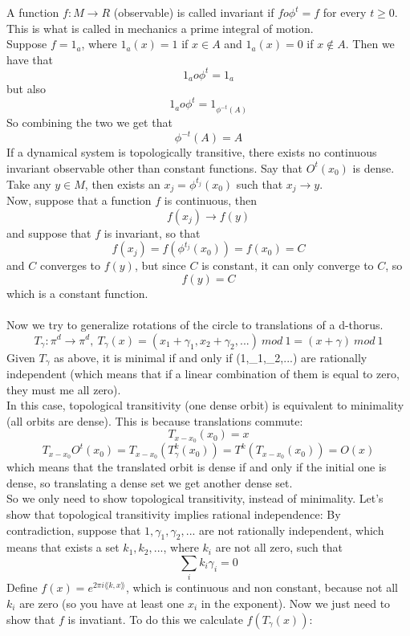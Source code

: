 A function $f:M\rightarrow R$ (observable) is called invariant if $fo\phi^t = f$ for every $t \geq 0$. This is what is called in mechanics a prime integral of motion. \\
Suppose $f = 1_a$, where $1_a(x) = 1$ if $x\in A$ and $1_a(x) = 0$ if $x \notin A$. Then we have that
$$
	1_a o \phi^t = 1_a
$$
but also 
$$
	1_a o \phi^t = 1_{\phi^{-t}(A)}
$$
So combining the two we get that 
$$
	\phi^{-t}(A) = A
$$
If a dynamical system is topologically transitive, there exists no continuous invariant observable other than constant functions.
Say that $O^t(x_0)$ is dense. Take any $y \in M$, then exists an $x_j = \phi^{t_j}(x_0)$ such that $x_j \longrightarrow y$. \\
Now, suppose that a function $f$ is continuous, then
$$
	f(x_j) \longrightarrow f(y)
$$
and suppose that $f$ is invariant, so that
$$
	f(x_j) = f(\phi^{t_j}(x_0)) = f(x_0) = C
$$
and $C$ converges to $f(y)$, but since $C$ is constant, it can only converge to $C$, so 
$$
	f(y) = C
$$
which is a constant function. \\ \\
Now we try to generalize rotations of the circle to translations of a d-thorus. \\
$$
	T_\gamma : \pi^d \rightarrow \pi^d, \ T_\gamma (x) = (x_1 + \gamma_1, x_2 + \gamma_2, ...) \ mod \ 1 = (x + \gamma) \ mod \ 1
$$
Given $T_\gamma$ as above, it is minimal if and only if (1,\gamma_1,\gamma_2,...) are rationally independent (which means that if a linear combination of them is equal to zero, they must me all zero). \\
In this case, topological transitivity (one dense orbit) is equivalent to minimality (all orbits are dense). This is because translations commute:
$$
	T_{x-x_0}(x_0) = x
$$
$$
	T_{x-x_0} O^t(x_0) = T_{x-x_0}(T^k_\gamma(x_0)) = T^k(T_{x-x_0}(x_0)) = O(x)
$$
which means that the translated orbit is dense if and only if the initial one is dense, so translating a dense set we get another dense set. \\
So we only need to show topological transitivity, instead of minimality. Let's show that topological transitivity implies rational independence: By contradiction, suppose that $1,\gamma_1,\gamma_2,...$ are not rationally independent, which means that exists a set $k_1,k_2,...$, where $k_i$ are not all zero, such that
$$
	\sum_i k_i\gamma_i = 0
$$
Define $f(x) = e^{2\pi i \lang k,x\rang}$, which is continuous and non constant, because not all $k_i$ are zero (so you have at least one $x_i$ in the exponent). Now we just need to show that $f$ is invatiant. To do this we calculate $f(T_\gamma(x))$:
